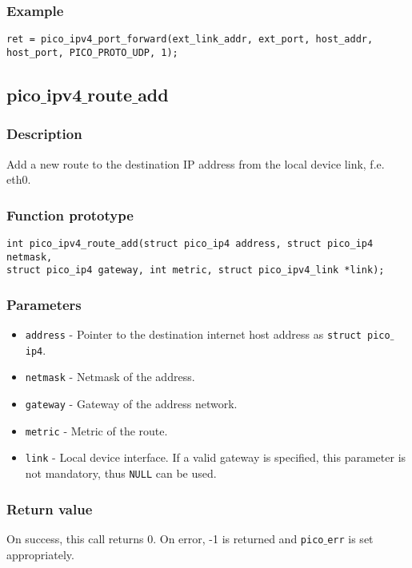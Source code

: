 \subsubsection*{Example}
\begin{verbatim}
ret = pico_ipv4_port_forward(ext_link_addr, ext_port, host_addr,
host_port, PICO_PROTO_UDP, 1);
\end{verbatim}



\subsection{pico$\_$ipv4$\_$route$\_$add}

\subsubsection*{Description}
Add a new route to the destination IP address from the local device link, f.e. eth0.

\subsubsection*{Function prototype}
\begin{verbatim}
int pico_ipv4_route_add(struct pico_ip4 address, struct pico_ip4 netmask,
struct pico_ip4 gateway, int metric, struct pico_ipv4_link *link);
\end{verbatim}

\subsubsection*{Parameters}
\begin{itemize}[noitemsep]
\item \texttt{address} - Pointer to the destination internet host address as \texttt{struct pico$\_$ip4}.
\item \texttt{netmask} - Netmask of the address.
\item \texttt{gateway} - Gateway of the address network.
\item \texttt{metric} - Metric of the route.
\item \texttt{link} - Local device interface. If a valid gateway is specified, this parameter is not mandatory,
thus \texttt{NULL} can be used.
\end{itemize}

\subsubsection*{Return value}
On success, this call returns 0. On error, -1 is returned and \texttt{pico$\_$err} is set appropriately. 

